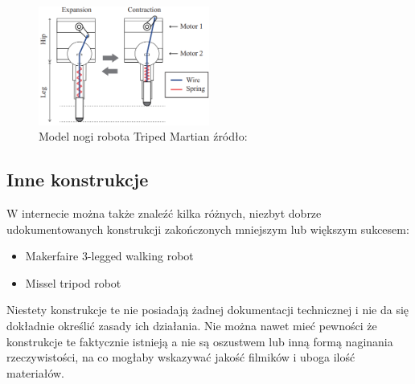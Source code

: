 \begin{figure}[h!]
\centering
\includegraphics[width=0.5\textwidth]{img/martian_model.png}
\caption{Model nogi robota Triped Martian źródło: \cite{Triped_Martian}}
\label{martian_leg}
\end{figure}

\subsection{Inne konstrukcje}
W internecie można także znaleźć kilka różnych, niezbyt dobrze udokumentowanych konstrukcji zakończonych mniejszym lub większym sukcesem:
\begin{itemize}[noitemsep]
\item Makerfaire 3-legged walking robot \cite{makerfaire_three_legged}%
\item Missel tripod robot \cite{Missel_tripod}%
\end{itemize}

Niestety konstrukcje te nie posiadają żadnej dokumentacji technicznej i nie da się dokładnie określić zasady ich działania. Nie można nawet mieć pewności że konstrukcje te faktycznie istnieją a nie są oszustwem lub inną formą naginania rzeczywistości, na co mogłaby wskazywać jakość filmików i uboga ilość materiałów.\\